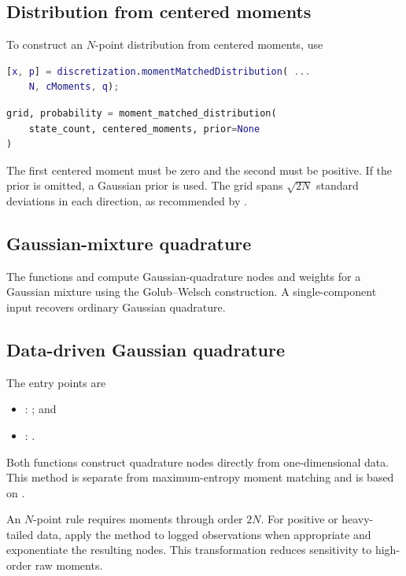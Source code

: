 \subsection{Distribution from centered moments}

To construct an $N$-point distribution from centered moments, use
\begin{lstlisting}[language=Matlab]
[x, p] = discretization.momentMatchedDistribution( ...
    N, cMoments, q);
\end{lstlisting}
\begin{lstlisting}[language=Python]
grid, probability = moment_matched_distribution(
    state_count, centered_moments, prior=None
)
\end{lstlisting}
The first centered moment must be zero and the second must be positive. If the
prior is omitted, a Gaussian prior is used. The grid spans
$\sqrt{2N}$ standard deviations in each direction, as recommended by
\textcite{FarmerToda2017QE}.

\subsection{Gaussian-mixture quadrature}

The functions  and
 compute Gaussian-quadrature nodes and
weights for a Gaussian mixture using the Golub--Welsch construction. A
single-component input recovers ordinary Gaussian quadrature.

\subsection{Data-driven Gaussian quadrature}

The entry points are
\begin{itemize}
  \item \matlab{}: ; and
  \item \python{}: .
\end{itemize}
Both functions construct quadrature nodes directly from one-dimensional data.
This method is separate from maximum-entropy moment matching and is based on
\textcite{Toda2021CE}.

An $N$-point rule requires moments through order $2N$. For positive or heavy-
tailed data, apply the method to logged observations when appropriate and
exponentiate the resulting nodes. This transformation reduces sensitivity to
high-order raw moments.

